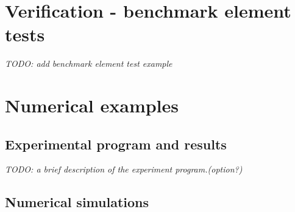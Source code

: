 \section{Verification - benchmark element tests} \label{sec:verification}

\textit{TODO: add benchmark element test example}


\section{Numerical examples} \label{sec:examples}

\subsection{Experimental program and results}
\textit{TODO: a brief description of the experiment program.(option?)}



\subsection{Numerical simulations}



